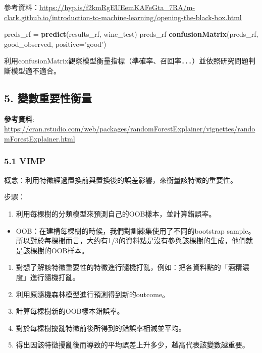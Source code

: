 \documentclass[]{book}
\newenvironment{Shaded}{\begin{snugshade}}{\end{snugshade}}
\newcommand{\KeywordTok}[1]{\textcolor[rgb]{0.13,0.29,0.53}{\textbf{#1}}}
\newcommand{\DataTypeTok}[1]{\textcolor[rgb]{0.13,0.29,0.53}{#1}}
\newcommand{\StringTok}[1]{\textcolor[rgb]{0.31,0.60,0.02}{#1}}
\newcommand{\NormalTok}[1]{#1}
\providecommand{\tightlist}{%
  \setlength{\itemsep}{0pt}\setlength{\parskip}{0pt}}
\begin{document}
參考資料：\url{https://hyp.is/f2kmRgEUEemKAFeGta_7RA/m-clark.github.io/introduction-to-machine-learning/opening-the-black-box.html}

\begin{Shaded}
\begin{Highlighting}[]
\NormalTok{preds_rf =}\StringTok{ }\KeywordTok{predict}\NormalTok{(results_rf, wine_test)}
\NormalTok{preds_rf}
\KeywordTok{confusionMatrix}\NormalTok{(preds_rf, good_observed, }\DataTypeTok{positive=}\StringTok{'good'}\NormalTok{)}
\end{Highlighting}
\end{Shaded}

利用confusionMatrix觀察模型衡量指標（準確率、召回率．．．）並依照研究問題判斷模型適不適合。

\subsection{5. 變數重要性衡量}

\textbf{參考資料}: \url{https://cran.rstudio.com/web/packages/randomForestExplainer/vignettes/randomForestExplainer.html}

\hypertarget{vimp}{%
\subsubsection{5.1 VIMP}\label{vimp}}

概念：利用特徵經過置換前與置換後的誤差影響，來衡量該特徵的重要性。

步驟：

\begin{enumerate}
\def\labelenumi{\arabic{enumi}.}
\tightlist
\item
  利用每棵樹的分類模型來預測自己的OOB樣本，並計算錯誤率。
\end{enumerate}

\begin{itemize}
\tightlist
\item
  OOB：在建構每棵樹的時候，我們對訓練集使用了不同的bootstrap sample。所以對於每棵樹而言，大约有1/3的資料點是沒有參與該棵樹的生成，他們就是該棵樹的OOB样本。
\end{itemize}

\begin{enumerate}
\def\labelenumi{\arabic{enumi}.}
\setcounter{enumi}{1}
\item
  對想了解該特徵重要性的特徵進行隨機打亂，例如：把各資料點的「酒精濃度」進行隨機打亂。
\item
  利用原隨機森林模型進行預測得到新的outcome。
\item
  計算每棵樹新的OOB樣本錯誤率。
\item
  對於每棵樹擾亂特徵前後所得到的錯誤率相減並平均。
\item
  得出因該特徵擾亂後而導致的平均誤差上升多少，越高代表該變數越重要。
\end{enumerate}
\end{document}
